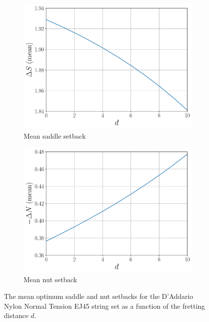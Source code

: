 \begin{figure}
  \centering
  \begin{subfigure}[b]{0.8\textwidth}
      \centering
      \includegraphics[width=5.0in]{figures/dsd_ej45}
      \caption{Mean saddle setback}
      \label{fig:dsd_ej45}
  \end{subfigure}
  \par\vspace{0.25in}
  \begin{subfigure}[b]{0.8\textwidth}
      \centering
      \includegraphics[width=5.0in]{figures/dnd_ej45}
      \caption{Mean nut setback}
      \label{fig:dnd_ej45}
  \end{subfigure}
  \caption{\label{fig:dsdnd_ej45} The mean optimum saddle and nut setbacks for the D'Addario Nylon Normal Tension EJ45 string set as a function of the fretting distance $d$.}
\end{figure}


